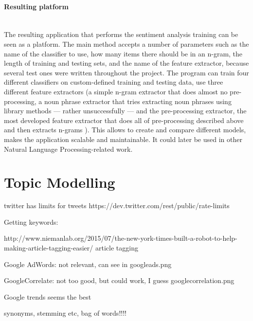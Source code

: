 \paragraph{Resulting platform}\mbox{}\\
The resulting application that performs the sentiment analysis training can be seen as a platform. The main method accepts a number of parameters such as the name of the classifier to use, how many items there should be in an n-gram, the length of training and testing sets, and the name of the feature extractor, because several test ones were written throughout the project. The program can train four different classifiers on custom-defined training and testing data, use three different feature extractors (a simple n-gram extractor that does almost no pre-processing, a noun phrase extractor that tries extracting noun phrases using library methods --- rather unsuccessfully --- and the pre-processing extractor, the most developed feature extractor that does all of pre-processing described above and then extracts n-grams ). This allows to create and compare different models, makes the application scalable and maintainable. It could later be used in other Natural Language Processing-related work.

\section{Topic Modelling}
\label{sec:tm}

twitter has limits for tweets
https://dev.twitter.com/rest/public/rate-limits


Getting keywords:

http://www.niemanlab.org/2015/07/the-new-york-times-built-a-robot-to-help-making-article-tagging-easier/
article tagging 

Google AdWords:
not relevant, can see in googleads.png

GoogleCorrelate:
not too good, but could work, I guess
googlecorrelation.png 


Google trends seems the best

synonyms, stemming etc, bag of words!!!!

